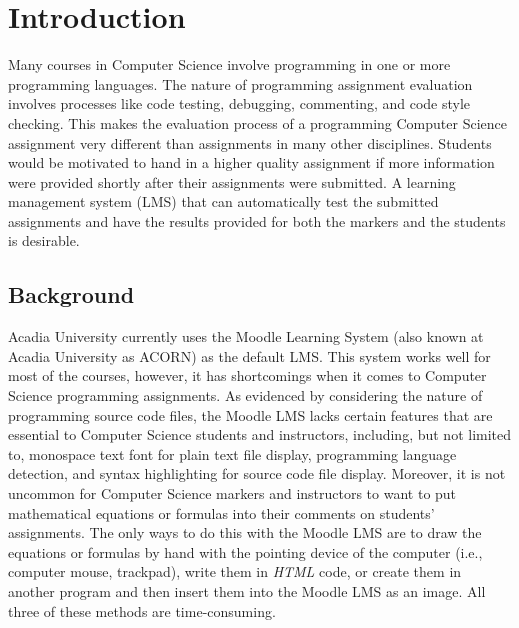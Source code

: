 

\chapter{Introduction}
\label{chap:INTRO}

Many courses in Computer Science involve programming in one or more programming
languages.
The nature of programming assignment evaluation
involves processes like code testing, debugging, commenting, and code style
checking.
This makes the evaluation process of a programming Computer Science assignment
very different than assignments in many other disciplines.
Students would be motivated to hand in a higher quality assignment
if more information were provided shortly after their assignments were
submitted.
A learning management system (LMS) that can automatically test the
submitted assignments and have the results provided for both the markers and
the students is desirable.

\section{Background}

Acadia University currently uses the Moodle Learning System (also known at 
Acadia University as ACORN) as the default LMS.
This system works well for most of the courses, however, it has shortcomings
when it comes to Computer Science programming assignments.
As evidenced by considering the nature of programming source code files,
the Moodle LMS lacks certain features that are essential to Computer Science
students and instructors,
including, but not limited to, monospace text font for plain text
file display, programming language detection, and syntax
highlighting for source code file display.
Moreover, it is not uncommon for Computer Science markers and instructors
to want to put mathematical equations or formulas into their comments on
students' assignments. The only ways to do this with the Moodle
LMS are to draw the equations or formulas by hand with the
pointing device of the computer (i.e., computer mouse, trackpad), write
them in \emph{HTML} code,
or create them in another program and then insert them into the Moodle LMS as
an image. All three of these methods are time-consuming.

\medskip

